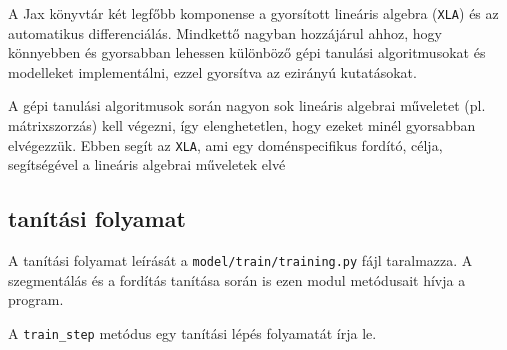 A Jax könyvtár két legfőbb komponense a gyorsított lineáris algebra (\texttt{XLA}) és az automatikus 
differenciálás. Mindkettő nagyban hozzájárul ahhoz, hogy könnyebben és gyorsabban lehessen különböző 
gépi tanulási algoritmusokat és modelleket implementálni, ezzel gyorsítva az ezirányú kutatásokat.

A gépi tanulási algoritmusok során nagyon sok lineáris algebrai műveletet (pl. mátrixszorzás) kell 
végezni, így elenghetetlen, hogy ezeket minél gyorsabban elvégezzük. Ebben segít az \texttt{XLA}, ami 
egy doménspecifikus fordító, célja, segítségével a lineáris algebrai műveletek elvé 

\subsection{tanítási folyamat}
A tanítási folyamat leírását a \texttt{model/train/training.py} fájl
taralmazza. A szegmentálás és a fordítás tanítása során is ezen modul
metódusait hívja a program.

A \texttt{train\_step} metódus egy tanítási lépés folyamatát írja le.
